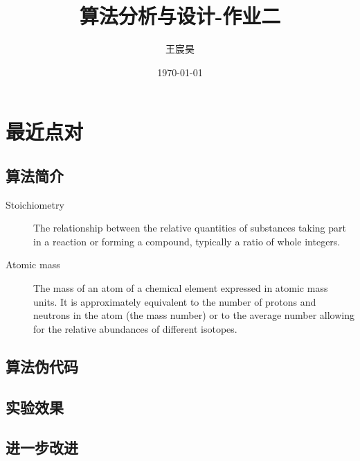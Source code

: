 \documentclass[UTF8]{ctexart}
\title{算法分析与设计-作业二}
\author{王宸昊}
\date{\today}
\begin{document}
\maketitle


\section{最近点对}


\subsection{算法简介}

\begin{description}
\item[Stoichiometry]
The relationship between the relative quantities of substances taking part in a reaction or forming a compound, typically a ratio of whole integers.
\item[Atomic mass]
The mass of an atom of a chemical element expressed in atomic mass units. It is approximately equivalent to the number of protons and neutrons in the atom (the mass number) or to the average number allowing for the relative abundances of different isotopes. 
\end{description} 

\subsection{算法伪代码}

\subsection{实验效果}

\subsection{进一步改进}
\end{document}
